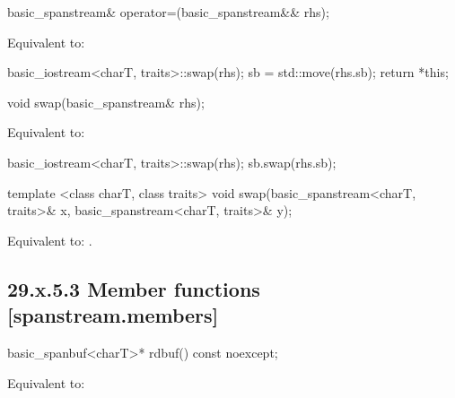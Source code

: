 \documentclass[ebook,11pt,article]{memoir}
\begin{document}
\begin{itemdecl}
basic_spanstream& operator=(basic_spanstream&& rhs);
\end{itemdecl}

\begin{itemdescr}
\pnum
\effects Equivalent to:
\begin{codeblock}
    basic_iostream<charT, traits>::swap(rhs);
    sb = std::move(rhs.sb);
    return *this;
\end{codeblock}
\end{itemdescr}

\begin{itemdecl}
void swap(basic_spanstream& rhs);
\end{itemdecl}

\begin{itemdescr}
\pnum
\effects Equivalent to:
\begin{codeblock}
    basic_iostream<charT, traits>::swap(rhs);
    sb.swap(rhs.sb);
\end{codeblock}
\end{itemdescr}


\begin{itemdecl}
template <class charT, class traits>
  void swap(basic_spanstream<charT, traits>& x,
            basic_spanstream<charT, traits>& y);
\end{itemdecl}

\begin{itemdescr}
\pnum
\effects Equivalent to: .
\end{itemdescr}

\subsection{29.x.5.3 Member functions [spanstream.members]}
\label{spanstream.members}

\begin{itemdecl}
basic_spanbuf<charT>* rdbuf() const noexcept;
\end{itemdecl}

\begin{itemdescr}
\pnum
\effects Equivalent to: \\
\end{itemdescr}
\end{document}
